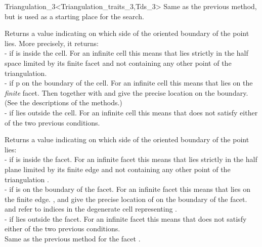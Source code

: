 \begin{ccRefClass}{Triangulation_3<Triangulation_traits_3,Tds_3>}
{Same as the previous method, but  is used as a starting
place for the search.}

{Returns a value indicating on which side of the oriented boundary
of  the point  lies. More precisely, it returns:\\
-  if  is inside the cell. For an infinite
cell this means that  lies strictly in the half space limited by
its finite facet and not containing any other point of the triangulation. \\
-  if p on the boundary of the cell. For an infinite
cell this means that  lies on the \textit{finite} facet. Then
 together with  and  give the precise location
on the boundary. (See the descriptions of the  methods.)\\ 
-  if  lies outside the cell. For an
infinite cell this means that  does not satisfy either of the
two previous conditions.  
}

{Returns a value indicating on which side of the oriented boundary
of  the point  lies:\\
-  if  is inside the facet. For an
infinite facet this means that  lies strictly in the half plane
limited by its finite edge and not containing any other point of the
triangulation . \\
-  if  is on the boundary of the facet.
For an infinite facet this means that  lies on the finite
edge. ,  and  give the precise location of
 on the boundary of the facet.  and  refer to
indices in the degenerate cell  representing .\\
-  if  lies outside the facet. For
an infinite facet this means that  does not satisfy either of
the two previous conditions. \\
}
\ccGlue
{}
{Same as the previous method for the facet .}


\end{ccRefClass}
